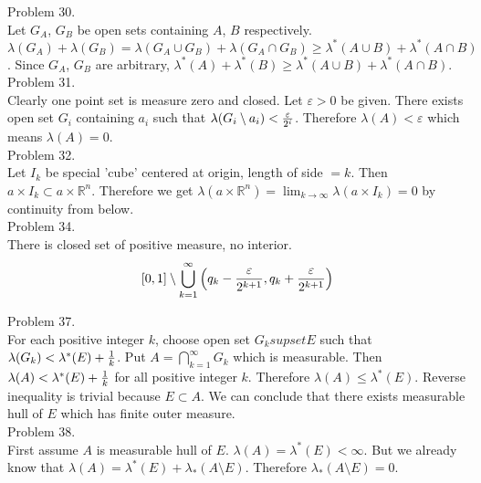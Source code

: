 Problem 30. \\

Let $G_{A}$, $G_{B}$ be open sets containing $A$, $B$ respectively.
$\lambda(G_A) + \lambda(G_B) = \lambda(G_A \cup G_B) + \lambda(G_A \cap G_B) \geq \lambda^{*}(A\cup B) + \lambda^{*}(A\cap B)$. Since $G_A$, $G_B$ are arbitrary, $\lambda^{*}(A) + \lambda^{*}(B) \geq \lambda^{*}(A\cup B) + \lambda^{*}(A \cap B)$.\\

Problem 31. \\

Clearly one point set is measure zero and closed. Let $\varepsilon >0$ be given. There exists open set $G_i$ containing $a_i$ such that $\lambda(G_i \setminus a_i) < {\varepsilon \over 2^i}$. Therefore $\lambda(A) <\varepsilon$ which means $\lambda(A) = 0$.\\

Problem 32. \\

Let $I_{k}$ be special 'cube' centered at origin, length of side $= k$. Then $a \times I_k \subset a \times \mathbb{R}^n$. Therefore we get $\lambda(a \times \mathbb{R}^n) = \lim_{k\rightarrow \infty}\lambda(a\times I_k) = 0$ by continuity from below.\\

Problem 34. \\

There is closed set of positive measure, no interior. \begin{equation}
	\left [ 0, 1 \right ] \setminus \bigcup_{k=1}^{\infty}\left (q_k - {\varepsilon \over 2^{k+1} }, q_k + {\varepsilon \over 2^{k+1} } \right )
\end{equation}

Problem 37. \\

For each positive integer $k$, choose open set $G_k supset E$ such that $\lambda(G_k) < \lambda^{*}(E) + {1 \over k}$. Put $A = \bigcap_{k=1}^{\infty}G_k$ which is measurable. Then $\lambda(A) < \lambda^{*}(E) + {1 \over k}$ for all positive integer $k$. Therefore $\lambda(A) \leq \lambda^{*}(E)$. Reverse inequality is trivial because $E \subset A$. We can conclude that there exists measurable hull of $E$ which has finite outer measure. \\

Problem 38. \\

First assume $A$ is measurable hull of $E$. $\lambda(A) = \lambda^{*}(E) < \infty$. But we already know that $\lambda(A) = \lambda^{*}(E) + \lambda_{*}(A \setminus E)$. Therefore $\lambda_{*}(A \setminus E) = 0$.

